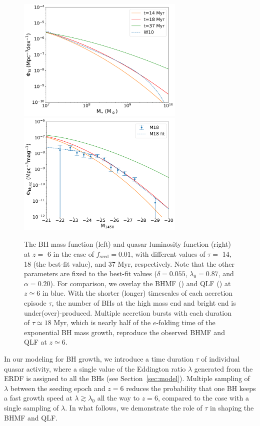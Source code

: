 \documentclass[twocolumn, twocolappendix]{aastex63}
\newcommand{\tlife}{\tau}
\newcommand{\fseed}{f_\mathrm{seed}}
\begin{document}
\begin{CJK*}{UTF8}{gbsn}
\begin{figure}
\centering
\includegraphics[width=80mm]{f2MFtau.pdf}
\includegraphics[width=80mm]{f2LFtau.pdf}
\caption{
The BH mass function (left) and quasar luminosity function (right) at $z=$ 6 in the case of $\fseed=0.01$,
with different values of $\tlife=$ 14, 18 (the best-fit value), and 37 Myr, respectively.
Note that the other parameters are fixed to the best-fit values ($\delta=0.055$, $\lambda_0=0.87$, and $\alpha=0.20$).
For comparison, we overlay the BHMF () and QLF () at $z\simeq 6$ in blue.
With the shorter (longer) timescales of each accretion episode $\tlife$, the number of BHs at the high mass end and bright end is under(over)-produced.
Multiple accretion bursts with each duration of $\tau \simeq 18$ Myr, which is nearly half of the $e$-folding time of the exponential BH mass growth,
reproduce the observed BHMF and QLF at $z\simeq 6$.
}
\label{fig:tau}
\vspace{4mm}
\end{figure}




In our modeling for BH growth, we introduce a time duration $\tau$ of individual quasar activity,
where a single value of the Eddington ratio $\lambda$ generated from the ERDF is assigned to all the BHs (see Section~\ref{sec:model}).
Multiple sampling of $\lambda$ between the seeding epoch and $z=6$ reduces the probability that one BH
keeps a fast growth speed at $\lambda \gtrsim \lambda_0$ all the way to $z=6$, compared to the case with a single sampling of $\lambda$.
In what follows, we demonstrate the role of $\tlife$ in shaping the BHMF and QLF.


\end{CJK*}
\end{document}
